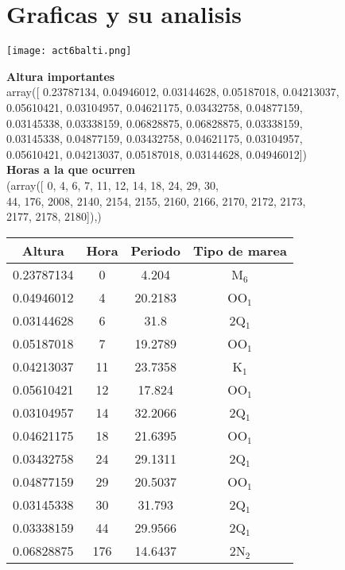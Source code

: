 \documentclass[a4paper,12pt]{article}
\begin{document}
\section{Graficas y su analisis}

\begin{center}
\texttt{[image: act6balti.png]}
\end{center}
\newpage
\noindent
\textbf{Altura importantes}\\
\noindent
array([ 0.23787134,  0.04946012,  0.03144628,  0.05187018,  0.04213037,\\
        0.05610421,  0.03104957,  0.04621175,  0.03432758,  0.04877159,\\
        0.03145338,  0.03338159,  0.06828875,  0.06828875,  0.03338159,\\
        0.03145338,  0.04877159,  0.03432758,  0.04621175,  0.03104957,\\
        0.05610421,  0.04213037,  0.05187018,  0.03144628,  0.04946012])\\
\noindent
\textbf{Horas a la que ocurren}\\
\noindent
(array([   0,    4,    6,    7,   11,   12,   14,   18,   24,   29,   30,\\
          44,  176, 2008, 2140, 2154, 2155, 2160, 2166, 2170, 2172, 2173,\\
        2177, 2178, 2180]),)
\begin{center}
\begin{tabular}{|c|c|c|c|}
\hline
Altura & Hora & Periodo & Tipo de marea \\ \hline
0.23787134 & 0 & 4.204 &M$_6$\\ \hline
0.04946012 & 4 &20.2183 &OO$_1$\\ \hline
0.03144628 &6 &31.8 &2Q$_1$\\ \hline
0.05187018 &7 &19.2789 &OO$_1$\\ \hline
0.04213037 &11 &23.7358 &K$_1$\\ \hline
0.05610421 &12 &17.824 &OO$_1$\\ \hline
0.03104957 &14 &32.2066 &2Q$_1$\\ \hline
0.04621175 &18 &21.6395 &OO$_1$\\ \hline
0.03432758 &24 &29.1311 &2Q$_1$\\ \hline
0.04877159 &29 &20.5037 &OO$_1$\\ \hline
0.03145338 &30 &31.793 &2Q$_1$\\ \hline
0.03338159 &44 &29.9566 &2Q$_1$\\ \hline
0.06828875 &176 &14.6437 &2N$_2$\\ \hline
\end{tabular}
\end{center}
\end{document}
